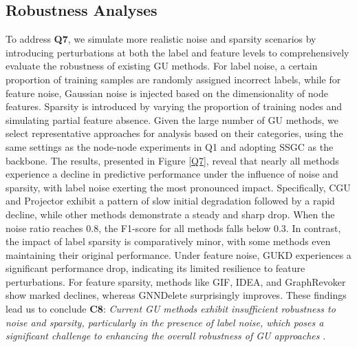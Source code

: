 \subsection{Robustness Analyses}
To address \textbf{Q7}, we simulate more realistic noise and sparsity scenarios by introducing perturbations at both the label and feature levels to comprehensively evaluate the robustness of existing GU methods. For label noise, a certain proportion of training samples are randomly assigned incorrect labels, while for feature noise, Gaussian noise is injected based on the dimensionality of node features. Sparsity is introduced by varying the proportion of training nodes and simulating partial feature absence. Given the large number of GU methods, we select representative approaches for analysis based on their categories, using the same settings as the node-node experiments in Q1 and adopting SSGC as the backbone. The results, presented in Figure \ref{Q7}, reveal that nearly all methods experience a decline in predictive performance under the influence of noise and sparsity, with label noise exerting the most pronounced impact. Specifically, CGU and Projector exhibit a pattern of slow initial degradation followed by a rapid decline, while other methods demonstrate a steady and sharp drop. When the noise ratio reaches 0.8, the F1-score for all methods falls below 0.3. In contrast, the impact of label sparsity is comparatively minor, with some methods even maintaining their original performance. Under feature noise, GUKD experiences a significant performance drop, indicating its limited resilience to feature perturbations. For feature sparsity, methods like GIF, IDEA, and GraphRevoker show marked declines, whereas GNNDelete surprisingly improves. These findings lead us to conclude \textbf{C8}: \textit{Current GU methods exhibit insufficient robustness to noise and sparsity, particularly in the presence of label noise, which poses a significant challenge to enhancing the overall robustness of GU approaches} \cite{robustness2}.









